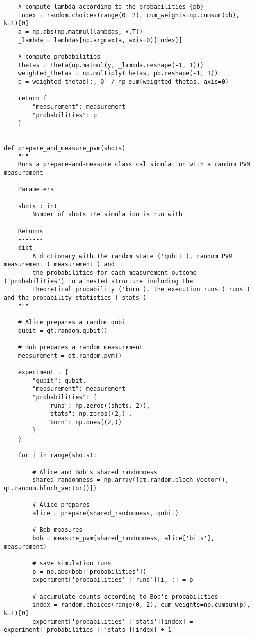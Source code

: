 \begin{verbatim}
    # compute lambda according to the probabilities {pb}
    index = random.choices(range(0, 2), cum_weights=np.cumsum(pb), k=1)[0]
    a = np.abs(np.matmul(lambdas, y.T))
    _lambda = lambdas[np.argmax(a, axis=0)[index]]

    # compute probabilities
    thetas = theta(np.matmul(y, _lambda.reshape(-1, 1)))
    weighted_thetas = np.multiply(thetas, pb.reshape(-1, 1))
    p = weighted_thetas[:, 0] / np.sum(weighted_thetas, axis=0)

    return {
        "measurement": measurement,
        "probabilities": p
    }


def prepare_and_measure_pvm(shots):
    """
    Runs a prepare-and-measure classical simulation with a random PVM measurement

    Parameters
    ---------
    shots : int
        Number of shots the simulation is run with

    Returns
    -------
    dict
        A dictionary with the random state ('qubit'), random PVM measurement ('measurement') and
        the probabilities for each measurement outcome ('probabilities') in a nested structure including the
        theoretical probability ('born'), the execution runs ('runs') and the probability statistics ('stats')
    """

    # Alice prepares a random qubit
    qubit = qt.random.qubit()

    # Bob prepares a random measurement
    measurement = qt.random.pvm()

    experiment = {
        "qubit": qubit,
        "measurement": measurement,
        "probabilities": {
            "runs": np.zeros((shots, 2)),
            "stats": np.zeros((2,)),
            "born": np.ones((2,))
        }
    }

    for i in range(shots):

        # Alice and Bob's shared randomness
        shared_randomness = np.array([qt.random.bloch_vector(), qt.random.bloch_vector()])

        # Alice prepares
        alice = prepare(shared_randomness, qubit)

        # Bob measures
        bob = measure_pvm(shared_randomness, alice['bits'], measurement)

        # save simulation runs
        p = np.abs(bob['probabilities'])
        experiment['probabilities']['runs'][i, :] = p

        # accumulate counts according to Bob's probabilities
        index = random.choices(range(0, 2), cum_weights=np.cumsum(p), k=1)[0]
        experiment['probabilities']['stats'][index] = experiment['probabilities']['stats'][index] + 1


\end{verbatim}

